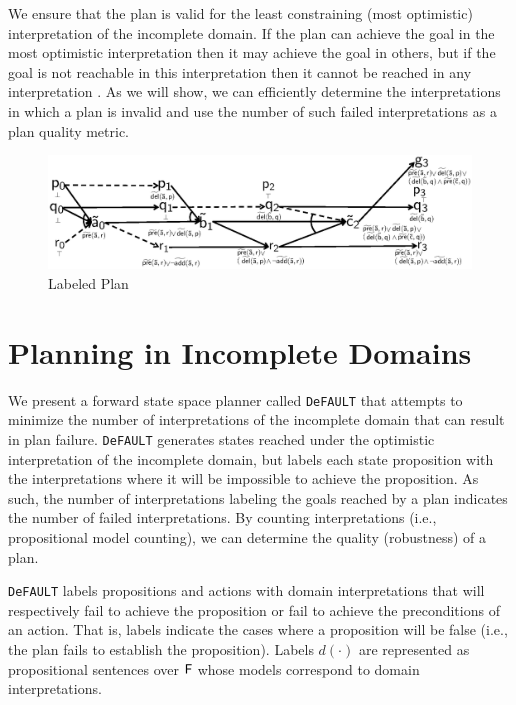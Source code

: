 \documentclass[letterpaper]{article}
\def\und#1{\noindent{\bf #1}:}
\def\FFRISKY{{\tt DeFAULT}}
\def\citep#1{\cite{#1}}
\begin{document}
We ensure that the plan is valid for the
least constraining (most optimistic) interpretation of the incomplete domain. 
If the plan can achieve the goal in the most optimistic interpretation then it
may achieve the goal in others, but if the goal is not reachable in this
interpretation then it cannot be reached in any interpretation \citep{USU-CS-TR-11-001}.  As we
will show, we can efficiently determine the interpretations in which a plan is
invalid and use the number of such failed interpretations as a plan quality metric.


\begin{figure}[t]\centering
\vspace*{-1cm}
\includegraphics[width=\linewidth]{WeberBryceICAPS11Fig1.eps}
\vspace*{-1cm}\caption{\label{fig:example} Labeled Plan}
\end{figure}



\section{Planning in Incomplete Domains}

We present a forward state space planner called \FFRISKY{} that attempts to minimize the number of interpretations of the incomplete domain that can result in plan failure.  \FFRISKY{} generates states reached under the optimistic interpretation of the incomplete domain, but labels each state proposition with the interpretations where it will be impossible to achieve the proposition.  As such, the number of interpretations labeling the goals reached by a plan indicates the number of failed interpretations.  By counting interpretations (i.e., propositional model counting), we can determine the quality (robustness) of a plan.

\FFRISKY{} labels propositions and actions with domain interpretations that will respectively fail to achieve the proposition or fail to achieve the preconditions of an action.  That is, labels indicate the cases where a proposition will be false (i.e., the plan fails to establish the proposition).  Labels $d(\cdot)$ are represented as  propositional sentences over ${\sf F}$ whose models correspond to domain interpretations.  
\end{document}
